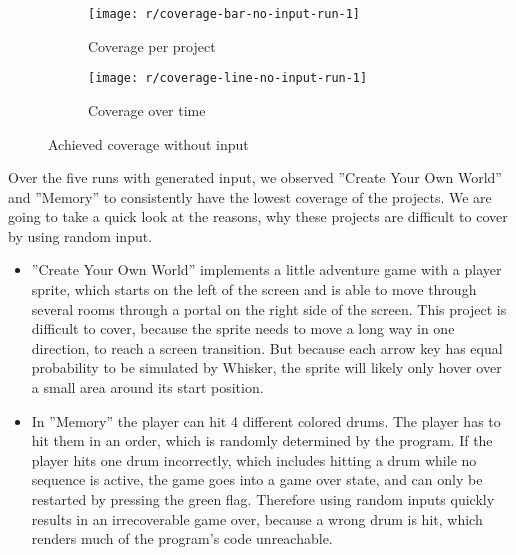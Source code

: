 \begin{figure}[htpb]
    \centering
    \begin{subfigure}{\textwidth}
        \texttt{[image: r/coverage-bar-no-input-run-1]}
        \caption{Coverage per project}
        \label{fig:coverage_no_input_bar}
    \end{subfigure}

    \bigskip

    \begin{subfigure}{\textwidth}
        \texttt{[image: r/coverage-line-no-input-run-1]}
        \caption{Coverage over time}
        \label{fig:coverage_no_input_line}
    \end{subfigure}

    \caption{Achieved coverage without input}
    \label{fig:coverage_no_input}
\end{figure}


Over the five runs with generated input, we observed ''Create Your Own World'' and ''Memory'' to consistently have the lowest coverage of the projects.
We are going to take a quick look at the reasons, why these projects are difficult to cover by using random input.

\begin{itemize}
    \item ''Create Your Own World'' implements a little adventure game with a player sprite, which starts on the left of the screen and is able to move through several rooms through a portal on the right side of the screen.
        This project is difficult to cover, because the sprite needs to move a long way in one direction, to reach a screen transition.
        But because each arrow key has equal probability to be simulated by Whisker, the sprite will likely only hover over a small area around its start position.
    \item In ''Memory'' the player can hit 4 different colored drums.
        The player has to hit them in an order, which is randomly determined by the program.
        If the player hits one drum incorrectly, which includes hitting a drum while no sequence is active, the game goes into a game over state,
        and can only be restarted by pressing the green flag.
        Therefore using random inputs quickly results in an irrecoverable game over,
        because a wrong drum is hit, which renders much of the program's code unreachable.
\end{itemize}

